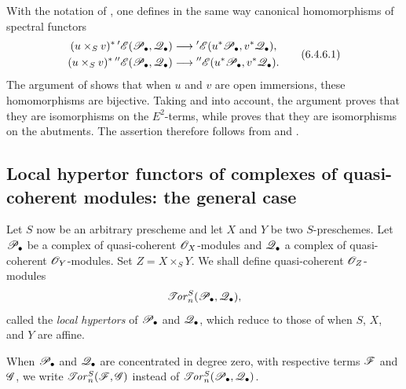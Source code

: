 \begin{env}[6.4.6]
\label{III.6.4.6}
With the notation of , one defines in the same way
canonical homomorphisms of spectral functors
\[
  \begin{aligned}
  (u\times_Sv)^*\,{}'\mathscr{E}(\mathscr{P}_\bullet,\mathscr{Q}_\bullet)
  &\longrightarrow
  {}'\mathscr{E}(u^*\mathscr{P}_\bullet,v^*\mathscr{Q}_\bullet),\\
  (u\times_Sv)^*\,{}''\mathscr{E}(\mathscr{P}_\bullet,\mathscr{Q}_\bullet)
  &\longrightarrow
  {}''\mathscr{E}(u^*\mathscr{P}_\bullet,v^*\mathscr{Q}_\bullet).
  \end{aligned}
  \tag{6.4.6.1}\label{III.6.4.6.1}
\]
The argument of  shows that when $u$ and $v$ are
open immersions, these homomorphisms are bijective.  Taking
 and  into account, the
argument proves that they are isomorphisms on the $E^2$-terms,
while  proves that they are isomorphisms on the
abutments.  The assertion therefore follows from
 and .
\end{env}


\subsection{Local hypertor functors of complexes of quasi-coherent modules: the general case}
\label{subsection:III.6.5}

\begin{env}[6.5.1]
\label{III.6.5.1}
Let $S$ now be an arbitrary prescheme and let $X$ and $Y$ be two
$S$-preschemes.  Let $\mathscr{P}_\bullet$ be a complex of quasi-coherent
$\mathscr{O}_X$-modules and $\mathscr{Q}_\bullet$ a complex of quasi-coherent
$\mathscr{O}_Y$-modules.  Set $Z=X\times_SY$.  We shall define
quasi-coherent $\mathscr{O}_Z$-modules
\[
  \mathscr{T}\!\mathit{or}_n^S(\mathscr{P}_\bullet,\mathscr{Q}_\bullet),
\]
called the \emph{local hypertors} of $\mathscr{P}_\bullet$ and
$\mathscr{Q}_\bullet$, which reduce to those of  when
$S$, $X$, and $Y$ are affine.

When $\mathscr{P}_\bullet$ and $\mathscr{Q}_\bullet$ are concentrated in
degree zero, with respective terms $\mathscr{F}$ and $\mathscr{G}$, we write
$\mathscr{T}\!\mathit{or}_n^S(\mathscr{F},\mathscr{G})$ instead of
$\mathscr{T}\!\mathit{or}_n^S(\mathscr{P}_\bullet,\mathscr{Q}_\bullet)$.
\end{env}

